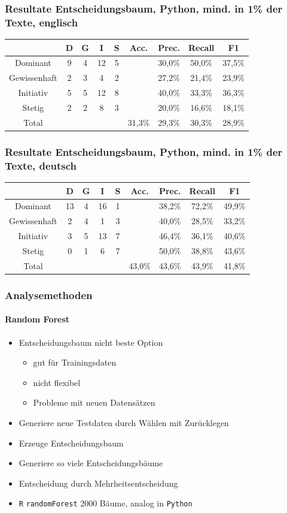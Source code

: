 \documentclass{beamer}
\begin{document}
\begin{frame}
\frametitle{Resultate Entscheidungsbaum, Python, mind. in 1\% der Texte, englisch}
\begin{center}
\begin{tabular}{|c|c|c|c|c|c|c|c|c|}
\hline
 &  D 	& G	& I & S	& Acc.	& Prec. & Recall	& F1\\
\hline
Dominant &     9 & 4 & 12 & 5& &30,0\% & 50,0\% & 37,5\% \\
Gewissenhaft & 2 & 3 & 4 & 2&& 27,2\% & 21,4\% & 23,9\% \\
Initiativ &    5 & 5 & 12 & 8&& 40,0\% & 33,3\% & 36,3\%\\
Stetig &       2 & 2 & 8 & 3&& 20,0\% & 16,6\% & 18,1\% \\
\hline
Total 	&		&		& &	& 31,3\%		& 29,3\% & 30,3\% & 28,9\% \\
\hline
\end{tabular}
\end{center}
\end{frame}
\begin{frame}
\frametitle{Resultate Entscheidungsbaum, Python, mind. in 1\% der Texte, deutsch}
\begin{center}
\begin{tabular}{|c|c|c|c|c|c|c|c|c|}
\hline
 &  D 	& G	& I & S	& Acc.	& Prec. & Recall	& F1\\
\hline
Dominant &     13 & 4 & 16 & 1&&  38,2\% & 72,2\% & 49,9\% \\
Gewissenhaft & 2 & 4 & 1 & 3 &&  40,0\% & 28,5\% & 33,2\%  \\
Initiativ &    3 & 5 & 13 & 7&& 46,4\% & 36,1\% & 40,6\%  \\
Stetig &       0 & 1 & 6 & 7 &&  50,0\% & 38,8\% & 43,6\% \\
\hline
Total 	&		&		& & 		&  43,0\%			&  43,6\% & 43,9\% & 41,8\% \\
\hline
\end{tabular}
\end{center}
\end{frame}
\begin{frame}
\frametitle{Analysemethoden}
\framesubtitle{Random Forest}
\begin{itemize}\setlength\parskip{12pt}
\item Entscheidungsbaum nicht beste Option
\begin{itemize}
	\item gut für Trainingsdaten
	\item nicht flexibel 
	\item Probleme mit neuen Datensätzen
\end{itemize}
\item Generiere neue Testdaten durch Wählen mit Zurücklegen
\item Erzeuge Entscheidungsbaum
\item Generiere so viele Entscheidungsbäume
\item Entscheidung durch Mehrheitsentscheidung
\item \texttt{R} \texttt{randomForest} 2000 Bäume, analog in  \texttt{Python}
\end{itemize}
\end{frame}
\end{document}
